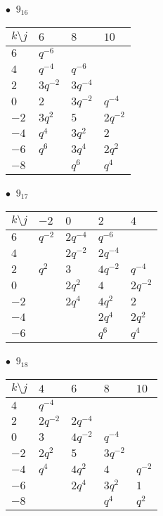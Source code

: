 %
\begin{minipage}{\linewidth}
$\bullet\ $ $9_{16}$ \vspace{0.5em} \\
\begin{tabular}{l|lll}
$k \setminus j$ & $6$ & $8$ & $10$ \\
\hline
$6$ & $q^{-6}$ &  &  \\
$4$ & $q^{-4}$ & $q^{-6}$ &  \\
$2$ & $3q^{-2}$ & $3q^{-4}$ &  \\
$0$ & $2$ & $3q^{-2}$ & $q^{-4}$ \\
$-2$ & $3q^{2}$ & $5$ & $2q^{-2}$ \\
$-4$ & $q^{4}$ & $3q^{2}$ & $2$ \\
$-6$ & $q^{6}$ & $3q^{4}$ & $2q^{2}$ \\
$-8$ &  & $q^{6}$ & $q^{4}$ \\
\end{tabular}
\vspace{2em}
\end{minipage}
%
\begin{minipage}{\linewidth}
$\bullet\ $ $9_{17}$ \vspace{0.5em} \\
\begin{tabular}{l|llll}
$k \setminus j$ & $-2$ & $0$ & $2$ & $4$ \\
\hline
$6$ & $q^{-2}$ & $2q^{-4}$ & $q^{-6}$ &  \\
$4$ &  & $2q^{-2}$ & $2q^{-4}$ &  \\
$2$ & $q^{2}$ & $3$ & $4q^{-2}$ & $q^{-4}$ \\
$0$ &  & $2q^{2}$ & $4$ & $2q^{-2}$ \\
$-2$ &  & $2q^{4}$ & $4q^{2}$ & $2$ \\
$-4$ &  &  & $2q^{4}$ & $2q^{2}$ \\
$-6$ &  &  & $q^{6}$ & $q^{4}$ \\
\end{tabular}
\vspace{2em}
\end{minipage}
%
\begin{minipage}{\linewidth}
$\bullet\ $ $9_{18}$ \vspace{0.5em} \\
\begin{tabular}{l|llll}
$k \setminus j$ & $4$ & $6$ & $8$ & $10$ \\
\hline
$4$ & $q^{-4}$ &  &  &  \\
$2$ & $2q^{-2}$ & $2q^{-4}$ &  &  \\
$0$ & $3$ & $4q^{-2}$ & $q^{-4}$ &  \\
$-2$ & $2q^{2}$ & $5$ & $3q^{-2}$ &  \\
$-4$ & $q^{4}$ & $4q^{2}$ & $4$ & $q^{-2}$ \\
$-6$ &  & $2q^{4}$ & $3q^{2}$ & $1$ \\
$-8$ &  &  & $q^{4}$ & $q^{2}$ \\
\end{tabular}
\vspace{2em}
\end{minipage}
